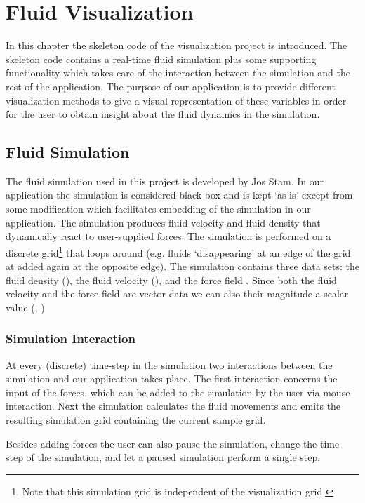 
\chapter{Fluid Visualization} %
\label{cha:skeleton_compilation}
In this chapter the skeleton code of the visualization project is introduced. The skeleton code contains a real-time fluid simulation plus some supporting functionality which takes care of the interaction between the simulation and the rest of the application. The purpose of our application is to provide different visualization methods to give a visual representation of these variables in order for the user to obtain insight about the fluid dynamics in the simulation. 

\section{Fluid Simulation} %
\label{sec:fluid_simulation}
The fluid simulation used in this project is developed by Jos Stam\cite{Simulation:Stam:2002}. In our application the simulation is considered black-box and is kept `as is' except from some modification which facilitates embedding of the simulation in our application. The simulation produces fluid velocity and fluid density that dynamically react to user-supplied forces. The simulation is performed on a discrete grid\footnote{Note that this simulation grid is independent of the visualization grid.} that loops around (e.g. fluids `disappearing' at an edge of the grid at added again at the opposite edge). The simulation contains three data sets: the fluid density (\density), the fluid velocity (\velocity), and the force field \force. Since both the fluid velocity and the force field are vector data we can also their magnitude a scalar value (\velocitymagnitude, \forcefieldmagnitude)

\subsection{Simulation Interaction} %
\label{sub:simulation_interaction}
At every (discrete) time-step in the simulation two interactions between the simulation and our application takes place. The first interaction concerns the input of the forces, which can be added to the simulation by the user via mouse interaction. Next the simulation calculates the fluid movements and emits the resulting simulation grid containing the current sample grid. 

Besides adding forces the user can also pause the simulation, change the time step of the simulation, and let a paused simulation perform a single step.



